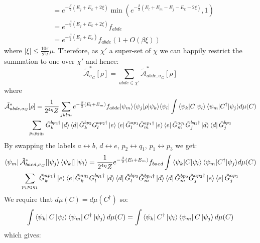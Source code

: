 \documentclass[aps,floatfix,10pt,amssymb,amsfont,amsmath,superscriptaddress,float,nofootinbib,longbibliography,nobalancelastpage,twocolumn]{revtex4-2}
\begin{document}
\begin{widetext}
\begin{equation}
\begin{aligned}
    &= e^{-\frac{\beta}{2}(E_j+E_k + 2\xi)} \min(e^{-\frac{\beta}{2}(E_l+E_m-E_j-E_k-2\xi)},1)\\
    &= e^{-\frac{\beta}{2}(E_j+E_k + 2\xi)}f_{abde}\\
    &= e^{-\frac{\beta}{2}(E_j+E_k)}f_{abde}(1+O(\beta\xi))
\end{aligned}
\label{eq:fabtofba}
\end{equation}
where $|\xi| \leq \frac{10\pi}{2^{\eta}t}\mu$. Therefore, as $\chi'$ a super-set of $\chi$ we can happily restrict the summation to one over $\chi'$ and hence:
\begin{equation}
    \tilde{\mathcal{A}}^*_{\sigma_G}[\rho] =  \sum_{abde\in \chi'}\tilde{\mathcal{A}}^*_{abde,\sigma_G}[\rho]
\end{equation}
where 
\begin{multline}
  \tilde{\mathcal{A}}^*_{abde,\sigma_G}[\rho] = \frac{1}{2^{4\eta}Z} \sum_{jklm}  e^{-\frac{\beta}{2}(E_l+E_m)}{f_{abde}} {\ket{\psi_m}}{\bra{\psi_j}}\rho{\ket{\psi_k}}{\bra{\psi_l}} \int {\braket{\psi_k|C|\psi_l}\braket{\psi_m|C^{\dagger}|\psi_j}} d\mu(C)\\\sum_{p_1p_2q_1} {\tilde G^{bp_3\dagger}_k\ket{d}\bra{d}\tilde G^{bp_2}_k} {G_l^{ap_2\dagger}\ket{e}\bra{e}\tilde G_l^{ap_1}\tilde G_m^{ap_1\dagger}\ket{e}\bra{e}\tilde G_m^{aq_1}} {\tilde G^{bq_1\dagger}_j\ket{d}\bra{d}\tilde G^{bp_3}_j } 
\end{multline}
By swapping the labels $a \leftrightarrow b$, $d \leftrightarrow e$, $p_2 \leftrightarrow q_1$, $p_1 \leftrightarrow p_3$ we get:
\begin{multline}
   \bra{\psi_m}\tilde{\mathcal{A}}^*_{baed,\sigma_G}[\ket{\psi_j}\bra{\psi_k}]\ket{\psi_l}  =\frac{1}{2^{4\eta}Z} e^{-\frac{\beta}{2}(E_l+E_m)}{f_{baed}} \int {\braket{\psi_k|C|\psi_l}\braket{\psi_m|C^{\dagger}|\psi_j}} d\mu(C)\\\sum_{p_1p_2q_1} {\tilde G^{ap_1\dagger}_k\ket{e}\bra{e}\tilde G^{aq_1}_k} {G_l^{bq_1\dagger}\ket{d}\bra{d}\tilde G_l^{bp_3}\tilde G_m^{bp_3\dagger}\ket{d}\bra{d}\tilde G_m^{bp_2}} {\tilde G^{ap_2\dagger}_j\ket{e}\bra{e}\tilde G^{ap_1}_j } 
\end{multline}
We require that $d\mu(C) = d\mu(C^{\dagger})$ so:
\begin{equation}
    \int  \bra{\psi_k}C\ket{\psi_{l}}\bra{\psi_m}C^{\dagger} \ket{\psi_j} d\mu(C) = \int  \bra{\psi_k}C^{\dagger}\ket{\psi_{l}}\bra{\psi_m}C \ket{\psi_j} d\mu(C)
\end{equation}
which gives:
\begin{multline}

\end{multline}
\end{widetext}
\end{document}
